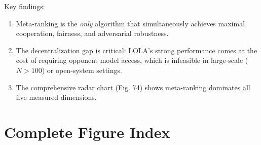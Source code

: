 \documentclass{article}
\begin{document}
\noindent Key findings:
\begin{enumerate}
    \item Meta-ranking is the \textit{only} algorithm that simultaneously achieves maximal cooperation, fairness, and adversarial robustness.
    \item The decentralization gap is critical: LOLA's strong performance comes at the cost of requiring opponent model access, which is infeasible in large-scale ($N{>}100$) or open-system settings.
    \item The comprehensive radar chart (Fig. 74) shows meta-ranking dominates all five measured dimensions.
\end{enumerate}


\section{Complete Figure Index}
\label{app:figures}
\end{document}
